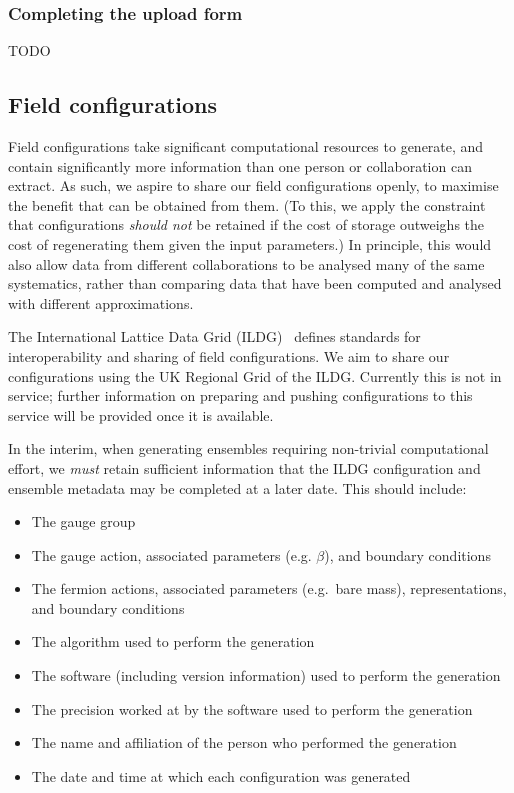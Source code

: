\documentclass{article}
\newcommand\rfcword[1]{\emph{#1}\xspace}
\newcommand\must{\rfcword{must}}
\newcommand\shouldnot{\rfcword{should not}}
\begin{document}
\subsubsection{Completing the upload form}
TODO

\subsection{Field configurations}

Field configurations take significant computational resources to generate,
and contain significantly more information than one person or collaboration can extract.
As such,
we aspire to share our field configurations openly,
to maximise the benefit that can be obtained from them.
(To this,
we apply the constraint that
configurations \shouldnot be retained if the cost of storage outweighs
the cost of regenerating them given the input parameters.)
In principle,
this would also allow data from different collaborations
to be analysed many of the same systematics,
rather than comparing data that have been computed and analysed with different approximations.

The International Lattice Data Grid (ILDG)~\cite{ildg-organization}
defines standards for interoperability and sharing of field configurations.
We aim to share our configurations using the UK Regional Grid of the ILDG\@.
Currently this is not in service;
further information on preparing and pushing configurations to this service
will be provided once it is available.

In the interim,
when generating ensembles requiring non-trivial computational effort,
we \must retain sufficient information that
the ILDG configuration and ensemble metadata may be completed at a later date.
This should include:

\begin{itemize}
  \item
        The gauge group
  \item
        The gauge action, associated parameters (e.g. $\beta$), and boundary conditions
  \item
        The fermion actions, associated parameters (e.g.\ bare mass), representations, and boundary conditions
  \item
        The algorithm used to perform the generation
  \item
        The software (including version information) used to perform the generation
  \item
        The precision worked at by the software used to perform the generation
  \item
        The name and affiliation of the person who performed the generation
  \item
        The date and time at which each configuration was generated
\end{itemize}
\end{document}
